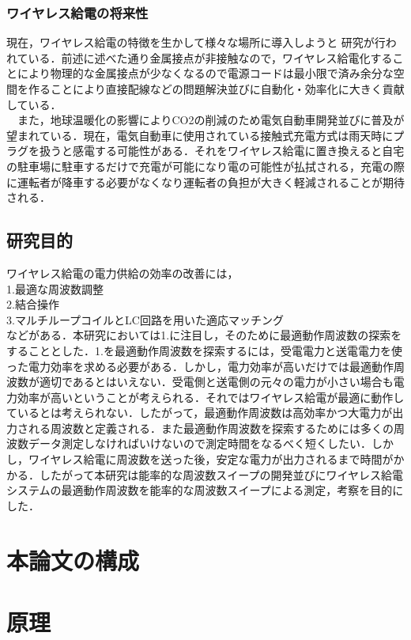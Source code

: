 \documentclass[12pt]{jarticle}
\begin{document}
\subsubsection{ワイヤレス給電の将来性}
現在，ワイヤレス給電の特徴を生かして様々な場所に導入しようと 研究が行われている．前述に述べた通り金属接点が非接触なので，ワイヤレス給電化することにより物理的な金属接点が少なくなるので電源コードは最小限で済み余分な空間を作ることにより直接配線などの問題解決並びに自動化・効率化に大きく貢献している\cite{syourai}\cite{matuda}．\\　また，地球温暖化の影響によりCO{\tiny 2}の削減のため電気自動車開発並びに普及が望まれている．現在，電気自動車に使用されている接触式充電方式は雨天時にプラグを扱うと感電する可能性がある．それをワイヤレス給電に置き換えると自宅の駐車場に駐車するだけで充電が可能になり電の可能性が払拭される，充電の際に運転者が降車する必要がなくなり運転者の負担が大きく軽減されることが期待される．\cite{hakugin}
\clearpage
\subsection{研究目的}
ワイヤレス給電の電力供給の効率の改善には，\\1.最適な周波数調整\\2.結合操作\\3.マルチループコイルとLC回路を用いた適応マッチング\\などがある\cite{morita}．本研究においては1.に注目し，そのために最適動作周波数の探索をすることとした．1.を最適動作周波数を探索するには，受電電力と送電電力を使った電力効率を求める必要がある．しかし，電力効率が高いだけでは最適動作周波数が適切であるとはいえない．受電側と送電側の元々の電力が小さい場合も電力効率が高いということが考えられる．それではワイヤレス給電が最適に動作しているとは考えられない．したがって，最適動作周波数は高効率かつ大電力が出力される周波数と定義される．また最適動作周波数を探索するためには多くの周波数データ測定しなければいけないので測定時間をなるべく短くしたい．しかし，ワイヤレス給電に周波数を送った後，安定な電力が出力されるまで時間がかかる．したがって本研究は能率的な周波数スイープの開発並びにワイヤレス給電システムの最適動作周波数を能率的な周波数スイープによる測定，考察を目的にした．
\clearpage
\section{本論文の構成}

\clearpage
\section{原理}
\end{document}
